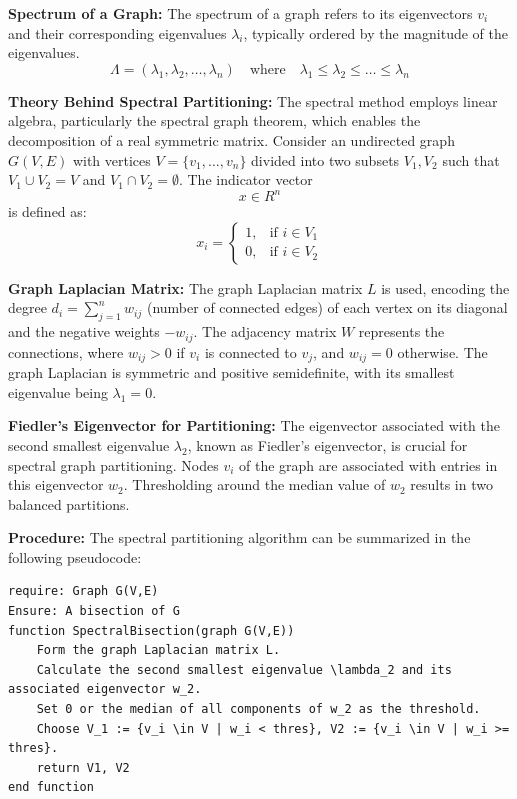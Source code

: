 \documentclass[unicode,11pt,a4paper,oneside,numbers=endperiod,openany]{scrartcl}
\begin{document}
\textbf{Spectrum of a Graph:}
The spectrum of a graph refers to its eigenvectors \( v_i \) and their corresponding eigenvalues \( \lambda_i \), typically ordered by the magnitude of the eigenvalues.
\begin{equation}
    \Lambda = (\lambda_1, \lambda_2, \ldots , \lambda_n) \quad \text{where} \quad \lambda_1 \leq \lambda_2 \leq \ldots \leq \lambda_n
\end{equation}

\textbf{Theory Behind Spectral Partitioning:}
The spectral method employs linear algebra, particularly the spectral graph theorem, which enables the decomposition of a real symmetric matrix. Consider an undirected graph \( G(V, E) \) with vertices \( V = \{v_1, \ldots, v_n\} \) divided into two subsets \( V_1, V_2 \) such that \( V_1 \cup V_2 = V \) and \( V_1 \cap V_2 = \emptyset \). The indicator vector \[ x \in R^n \] is defined as:
\begin{equation}
    x_i =
        \begin{cases}
         1, & \text{if } i \in V_1 \\
         0, & \text{if } i \in V_2
        \end{cases}
\end{equation}

\textbf{Graph Laplacian Matrix:}
The graph Laplacian matrix \( L \) is used, encoding the degree \( d_i = \sum^{n}_{j=1} w_{ij} \) (number of connected edges) of each vertex on its diagonal and the negative weights \(-w_{ij}\). The adjacency matrix \( W \) represents the connections, where \( w_{ij} > 0 \) if \( v_i \) is connected to \( v_j \), and \( w_{ij} = 0 \) otherwise. The graph Laplacian is symmetric and positive semidefinite, with its smallest eigenvalue being \( \lambda_1 = 0 \).

\textbf{Fiedler's Eigenvector for Partitioning:}
The eigenvector associated with the second smallest eigenvalue \( \lambda_2 \), known as Fiedler's eigenvector, is crucial for spectral graph partitioning. Nodes \( v_i \) of the graph are associated with entries in this eigenvector \( w_2 \). Thresholding around the median value of \( w_2 \) results in two balanced partitions.

\textbf{Procedure:}
The spectral partitioning algorithm can be summarized in the following pseudocode:

\begin{lstlisting}
require: Graph G(V,E)
Ensure: A bisection of G
function SpectralBisection(graph G(V,E))
    Form the graph Laplacian matrix L.
    Calculate the second smallest eigenvalue \lambda_2 and its associated eigenvector w_2.
    Set 0 or the median of all components of w_2 as the threshold.
    Choose V_1 := {v_i \in V | w_i < thres}, V2 := {v_i \in V | w_i >= thres}.
    return V1, V2
end function
\end{lstlisting}
\end{document}
